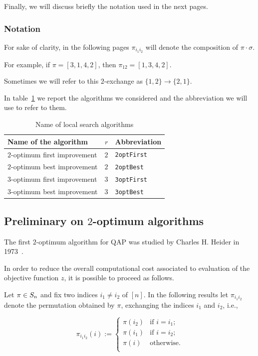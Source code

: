 Finally, we will discuss briefly the notation used in the next pages.
\subsubsection{Notation}


For sake of clarity, in the following pages $\pi_{i_1 i_2}$ will denote the composition of $\pi \cdot \sigma$. 

For example, if $\pi=[3,1,4,2]$, then $\pi_{12}=[1,3,4,2]$. 

Sometimes we will refer to this $2$-exchange as $\{1,2\}\to \{2,1\}$.


	In table~\ref{tab:NomiAlgLocSearch} we report the algorithms we considered and the abbreviation we will use to refer to them.


\begin{table}
\caption{Name of local search algorithms}
\label{tab:NomiAlgLocSearch}	
	\centering
	\begin{tabular}{lcl}
	\toprule
	Name of the algorithm & $r$ & Abbreviation \\
	\midrule
	$2$-optimum first improvement & $2$ & \texttt{2optFirst} \\
		$2$-optimum best improvement & $2$ & \texttt{2optBest} \\
			$3$-optimum first improvement & $3$ & \texttt{3optFirst} \\
				$3$-optimum best improvement & $3$ & \texttt{3optBest} \\
	\bottomrule	
	\end{tabular}
\end{table}


\subsection{Preliminary on $2$-optimum algorithms}
The first $2$-optimum algorithm for QAP was studied by Charles H. Heider in 1973~\cite{Heider1973}. 



In order to reduce the overall computational cost associated to evaluation of the objective function $z$, it is possible to proceed as follows.



Let $\pi \in S_n$ and fix two indices $i_1 \neq i_2$ of $[n]$. In the following results let $\pi_{i_1 i_2}$ denote the permutation obtained by $\pi$, exchanging the indices $i_1$ and $i_2$, i.e.,

\[
\pi_{i_1 i_2}(i) :=
\begin{cases}
\pi(i_2) & \text{if $i = i_1$;} \\
\pi(i_1) & \text{if $i = i_2$;} \\
\pi(i)   & \text{otherwise.} \\
\end{cases}
\]

